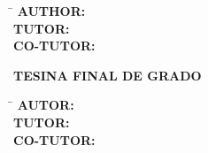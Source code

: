 \begin{titlepage}
{      \noindent
      \begin{minipage}[t]{0.40\textwidth}
        \raggedright
        {\itshape\fontsize{14}{20}\selectfont \thetitle\par}
      \end{minipage}%
      \begin{minipage}[t]{0.45\textwidth}
        \raggedright
        \begin{tabbing}
          \hspace{3.5cm}\=\kill
          \textbf{\fontsize{12}{10}\selectfont AUTHOR:}\> \GetFirstAuthor \\[0.3cm]
          \textbf{\fontsize{12}{10}\selectfont TUTOR:}\> \GetSupervisor   \\[0.3cm]
          \textbf{\fontsize{12}{10}\selectfont CO-TUTOR:}\> \GetCoSupervisor
        \end{tabbing}
      \end{minipage}%
      \begin{minipage}[t]{0.15\textwidth}
        \vspace{1.5cm}
        \raggedleft
        {\fontsize{13}{16}\selectfont \the\year \par}
      \end{minipage}
    }{%
      {\noindent\bfseries\fontsize{12}{14}\selectfont TESINA FINAL DE GRADO\par}
      \vspace{0.5cm}
      {\noindent\raggedright\itshape\fontsize{22}{24}\selectfont \titleesp\par}
      \vspace{2cm}

      \noindent
      
      \begin{minipage}[t]{0.55\textwidth}
        \raggedright
        \begin{tabbing}
          \hspace{3.5cm}\=\kill
          \textbf{\fontsize{12}{10}\selectfont AUTOR:}\> \GetFirstAuthor \\[0.3cm]
          \textbf{\fontsize{12}{10}\selectfont TUTOR:}\> \GetSupervisor   \\[0.3cm]
          \textbf{\fontsize{12}{10}\selectfont CO-TUTOR:}\> \GetCoSupervisor
        \end{tabbing}
      \end{minipage}%
      \begin{minipage}[t]{0.45\textwidth}
        \vspace{2cm}
        \raggedleft
        {\fontsize{13}{16}\selectfont \the\year \par}
      \end{minipage}
    }

    \vspace{1cm}
  \endgroup
\end{titlepage}
\restoregeometry
\MediaOptionLogicBlank